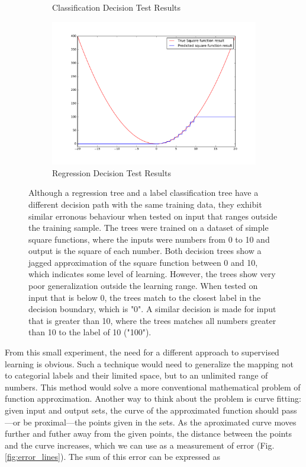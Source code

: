 \begin{figure}[!h]
\begin{subfigure}{.49\textwidth}
        \caption{Classification Decision Test Results}
    \end{subfigure} %
    \begin{subfigure}{0.49\textwidth}
        \centering
        \includegraphics[width=\linewidth]{figures/reg_tree_plot.pdf}
        \caption{Regression Decision Test Results}
    \end{subfigure}
  \caption{Although a regression tree and a label classification tree have a different decision path with the same training data, they exhibit similar erronous behaviour when tested on input that ranges outside the training sample. The trees were trained on a dataset of simple square functions, where the inputs were numbers from 0 to 10 and output is the square of each number. Both decision trees show a jagged approximation of the square function between 0 and 10, which indicates some level of learning. However, the trees show very poor generalization outside the learning range. When tested on input that is below 0, the trees match to the closest label in the decision boundary, which is "0". A similar decision is made for input that is greater than 10, where the trees matches all numbers greater than 10 to the label of 10 ("100").}
  \label{fig:decision_tree_regression_and_classification}
\end{figure}

From this small experiment, the need for a different approach to supervised learning is obvious. Such a technique would need to generalize the mapping not to categorial labels and their limited space, but to an unlimited range of numbers. This method would solve a more conventional mathematical problem of function approximation. Another way to think about the problem is curve fitting: given input and output sets, the curve of the approximated function should pass---or be proximal---the points given in the sets. 
As the aproximated curve moves further and futher away from the given points, the distance between the points and the curve increases, which we can use as a measurement of error (Fig. \ref{fig:error_lines}). The sum of this error can be expressed as

